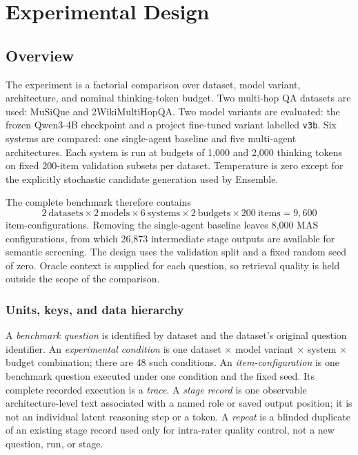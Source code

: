 \chapter{Experimental Design}
\label{chap:design}

\section{Overview}

The experiment is a factorial comparison over dataset, model variant, architecture, and nominal thinking-token budget. Two multi-hop QA datasets are used: MuSiQue and 2WikiMultiHopQA. Two model variants are evaluated: the frozen Qwen3-4B checkpoint and a project fine-tuned variant labelled \texttt{v3b}. Six systems are compared: one single-agent baseline and five multi-agent architectures. Each system is run at budgets of 1,000 and 2,000 thinking tokens on fixed 200-item validation subsets per dataset. Temperature is zero except for the explicitly stochastic candidate generation used by Ensemble.

The complete benchmark therefore contains
\begin{equation}
  2\ \text{datasets} \times 2\ \text{models} \times 6\ \text{systems} \times 2\ \text{budgets} \times 200\ \text{items} = 9{,}600
\end{equation}
item-configurations. Removing the single-agent baseline leaves 8,000 MAS configurations, from which 26,873 intermediate stage outputs are available for semantic screening. The design uses the validation split and a fixed random seed of zero. Oracle context is supplied for each question, so retrieval quality is held outside the scope of the comparison.

\subsection{Units, keys, and data hierarchy}

A \emph{benchmark question} is identified by dataset and the dataset's original question identifier. An \emph{experimental condition} is one dataset $\times$ model variant $\times$ system $\times$ budget combination; there are 48 such conditions. An \emph{item-configuration} is one benchmark question executed under one condition and the fixed seed. Its complete recorded execution is a \emph{trace}. A \emph{stage record} is one observable architecture-level text associated with a named role or saved output position; it is not an individual latent reasoning step or a token. A \emph{repeat} is a blinded duplicate of an existing stage record used only for intra-rater quality control, not a new question, run, or stage.

